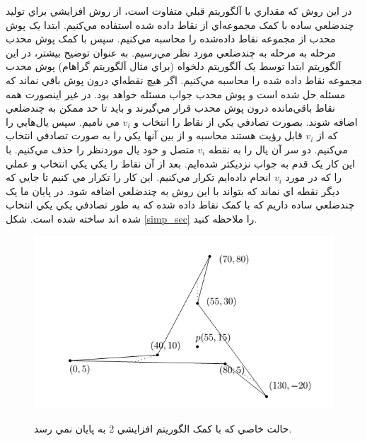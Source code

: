 \documentclass{book}
\begin{document}
در اين روش که مقداري با آلگوريتم قبلي متفاوت است، از روش افزايشي براي توليد چندضلعي ساده با کمک مجموعه‌اي از نقاط داده شده استفاده مي‌کنيم. ابتدا يک پوش محدب از مجموعه نقاط داده‌شده را محاسبه مي‌کنيم. سپس با کمک پوش محدب مرحله به مرحله به چندضلعي مورد نظر مي‌رسيم. به عنوان توضيح بيشتر، در اين آلگوريتم ابتدا توسط يک آلگوريتم دلخواه (براي مثال آلگوريتم گراهام)  پوش محدب مجموعه نقاط داده شده را محاسبه مي‌کنيم. اگر هيچ نقطه‌اي درون پوش باقي نماند که مسئله حل شده است و پوش محدب جواب مسئله خواهد بود. در غير اينصورت همه نقاط باقي‌مانده درون پوش محدب قرار مي‌گيرند و بايد تا حد ممکن به چندضلعي اضافه شوند. بصورت تصادفي يکي از نقاط را انتخاب و $v_i$  مي ناميم. سپس يال‌هايي را که از $v_i$ قابل رؤيت هستند محاسبه و از بين آنها يکي را به صورت تصادفي انتخاب مي‌کنيم. دو سر آن يال را به نقطه $v_i$ متصل و خود  يال موردنظر را حذف مي‌کنيم. با اين کار يک قدم به جواب نزديکتر شده‌ايم. بعد از آن نقاط را يکي يکي انتخاب و عملي را که در مورد $v_i$  انجام داده‌ايم تکرار مي‌کنيم. اين کار را تکرار مي کنيم تا جايي که ديگر نقطه اي نماند که بتواند با اين روش به چندضلعي اضافه شود. در پايان ما يک چندضلعي ساده داريم که با کمک نقاط داده شده که به طور تصادفي يکي يکي انتخاب شده اند ساخته شده است. شکل \ref{simp_sec} را ملاحظه کنيد.

\begin{figure}[h!]
    \begin{center}
        \includegraphics[width=\linewidth]{simp_sec2.jpg}
        \label{simp_sec2}
        \caption{حالت خاصي که با کمک الگوريتم افزايشي 2 به پايان نمي رسد.}
    \end{center}
\end{figure}
\end{document}
